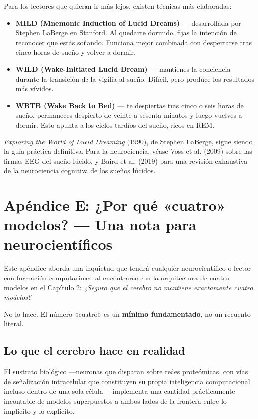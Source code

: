 \documentclass[11pt, twoside, openright]{book}
\begin{document}
Para los lectores que quieran ir más lejos, existen técnicas más elaboradas:

\begin{itemize}
  \item \textbf{MILD (Mnemonic Induction of Lucid Dreams)} --- desarrollada por Stephen LaBerge en Stanford. Al quedarte dormido, fijas la intención de reconocer que estás soñando. Funciona mejor combinada con despertarse tras cinco horas de sueño y volver a dormir.
  \item \textbf{WILD (Wake-Initiated Lucid Dream)} --- mantienes la conciencia durante la transición de la vigilia al sueño. Difícil, pero produce los resultados más vívidos.
  \item \textbf{WBTB (Wake Back to Bed)} --- te despiertas tras cinco o seis horas de sueño, permaneces despierto de veinte a sesenta minutos y luego vuelves a dormir. Esto apunta a los ciclos tardíos del sueño, ricos en REM.
\end{itemize}

\textit{Exploring the World of Lucid Dreaming} (1990), de Stephen LaBerge, sigue siendo la guía práctica definitiva. Para la neurociencia, véase Voss et al. (2009) sobre las firmas EEG del sueño lúcido, y Baird et al. (2019) para una revisión exhaustiva de la neurociencia cognitiva de los sueños lúcidos.


\chapter*{Apéndice E: ¿Por qué «cuatro» modelos? --- Una nota para neurocientíficos}

Este apéndice aborda una inquietud que tendrá cualquier neurocientífico o lector con formación computacional al encontrarse con la arquitectura de cuatro modelos en el Capítulo 2: \textit{¿Seguro que el cerebro no mantiene exactamente cuatro modelos?}

No lo hace. El número «cuatro» es un \textbf{mínimo fundamentado}, no un recuento literal.

\section*{Lo que el cerebro hace en realidad}

El sustrato biológico ---neuronas que disparan sobre redes proteómicas, con vías de señalización intracelular que constituyen su propia inteligencia computacional incluso dentro de una sola célula--- implementa una cantidad prácticamente incontable de modelos superpuestos a ambos lados de la frontera entre lo implícito y lo explícito.
\end{document}
